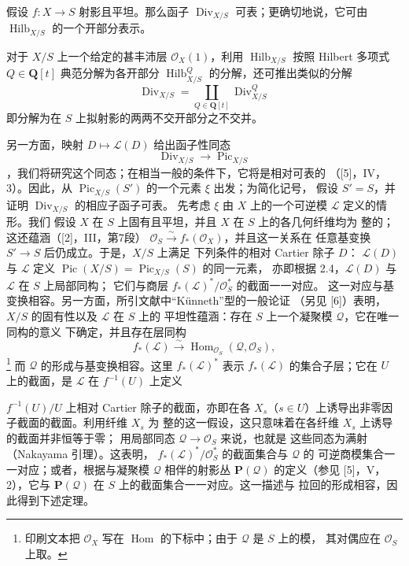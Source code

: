  假设 $f:X\longrightarrow S$ 射影且平坦。那么函子
$\operatorname{Div}_{X/S}$ 可表；更确切地说，它可由
$\operatorname{Hilb}_{X/S}$ 的一个开部分表示。

对于 $X/S$ 上一个给定的甚丰沛层 $\mathcal O_X(1)$，利用
$\operatorname{Hilb}_{X/S}$ 按照 Hilbert 多项式
$Q\in\mathbf Q[t]$ 典范分解为各开部分
$\operatorname{Hilb}^{Q}_{X/S}$ 的分解，还可推出类似的分解
\[
\operatorname{Div}_{X/S}=
\coprod_{Q\in\mathbf Q[t]}\operatorname{Div}^{Q}_{X/S}
\]
即分解为在 $S$ 上拟射影的两两不交开部分之不交并。

另一方面，映射 $D\longmapsto\mathcal L(D)$ 给出函子性同态
\begin{equation}
\operatorname{Div}_{X/S}\longrightarrow\operatorname{Pic}_{X/S}
\tag{+}
\end{equation}
，我们将研究这个同态；在相当一般的条件下，它将是相对可表的
（[5]，IV，3）。因此，从
$\operatorname{Pic}_{X/S}(S')$ 的一个元素 $\xi$ 出发；为简化记号，
假设 $S'=S$，并证明 $\operatorname{Div}_{X/S}$ 的相应子函子可表。
先考虑 $\xi$ 由 $X$ 上的一个可逆模 $\mathcal L$ 定义的情形。我们
假设 $X$ 在 $S$ 上固有且平坦，并且 $X$ 在 $S$ 上的各几何纤维均为
整的；这还蕴涵（[2]，III，第7段）
$\mathcal O_S\xrightarrow{\sim}f_*(\mathcal O_X)$，并且这一关系在
任意基变换 $S'\longrightarrow S$ 后仍成立。于是，$X/S$ 上满足
下列条件的相对 Cartier 除子 $D$：
$\mathcal L(D)$ 与 $\mathcal L$ 定义
$\operatorname{Pic}(X/S)=\operatorname{Pic}_{X/S}(S)$ 的同一元素，
亦即根据 2.4，$\mathcal L(D)$ 与 $\mathcal L$ 在 $S$ 上局部同构；
它们与商层 $f_*(\mathcal L)^*/\mathcal O_S^*$ 的截面一一对应。
这一对应与基变换相容。另一方面，所引文献中“Künneth”型的一般论证
（另见 [6]）表明，$X/S$ 的固有性以及 $\mathcal L$ 在 $S$ 上的
平坦性蕴涵：存在 $S$ 上一个凝聚模 $\mathcal Q$，它在唯一同构的意义
下确定，并且存在层同构
\[
f_*(\mathcal L)\xrightarrow{\sim}
\operatorname{Hom}_{\mathcal O_S}(\mathcal Q,\mathcal O_S),
\]
\footnote{印刷文本把 $\mathcal O_X$ 写在
$\operatorname{Hom}$ 的下标中；由于 $\mathcal Q$ 是 $S$ 上的模，
其对偶应在 $\mathcal O_S$ 上取。}
而 $\mathcal Q$ 的形成与基变换相容。这里
$f_*(\mathcal L)^*$ 表示 $f_*(\mathcal L)$ 的集合子层；它在 $U$
上的截面，是 $\mathcal L$ 在 $f^{-1}(U)$ 上定义

$f^{-1}(U)/U$ 上相对 Cartier 除子的截面，亦即在各
$X_s$（$s\in U$）上诱导出非零因子截面的截面。利用纤维 $X_s$ 为
整的这一假设，这只意味着在各纤维 $X_s$ 上诱导的截面并非恒等于零；
用局部同态 $\mathcal Q\longrightarrow\mathcal O_S$ 来说，也就是
这些同态为满射（Nakayama 引理）。这表明，
$f_*(\mathcal L)^*/\mathcal O_S^*$ 的截面集合与 $\mathcal Q$ 的
可逆商模集合一一对应；或者，根据与凝聚模 $\mathcal Q$ 相伴的射影丛
$\mathbf P(\mathcal Q)$ 的定义（参见 [5]，V，2），它与
$\mathbf P(\mathcal Q)$ 在 $S$ 上的截面集合一一对应。这一描述与
拉回的形成相容，因此得到下述定理。

